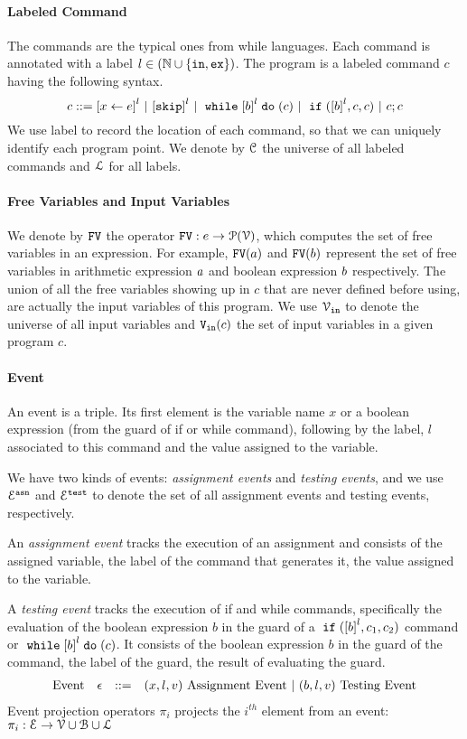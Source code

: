 \paragraph{Labeled Command}
The commands are the typical ones from while languages. Each command is annotated with a label $l \in (\mathbb{N} \cup \{\mathtt{in}, \mathtt{ex}\})$. The program is a labeled command $c$ having the following syntax. 
\[
{c} ::= 
\clabel{\assign{x}{\expr}}^l 
~|~  \clabel{\eskip}^l
~|~ \ewhile \clabel{\bexpr}^{l} \edo ({c})
~|~ \eif(\clabel{\bexpr}^{l} , {c}, {c}) 
~|~ {c};{c} 
\]
We use label to record
the location of each command, so that we can uniquely identify each program point.
We denote by $\mathcal{C}$ the universe of all labeled commands and $\mathcal{L}$ for all labels.

\paragraph{Free Variables and Input Variables}
  We denote by $\mathtt{FV}$ the operator $\mathtt{FV}: e \to \mathcal{P}(\mathcal{V})$, which computes the set of free variables in an expression. For example,
  $\mathtt{FV}(a)$ and $\mathtt{FV}(b)$ represent the set of free variables in arithmetic
  expression $a$ and boolean expression $b$ respectively.
  The union of all the free variables
  showing up in $c$ that are never defined before using, are actually the input variables of this program.
  We use $\mathcal{V}_{\mathtt{in}}$ to denote the universe of all input variables and $\mathtt{V_{\mathtt{in}}}(c)$ the set of input variables in a given program $c$.


\paragraph{Event}
An event is a triple.
Its first element is the variable name $x$
or a boolean expression (from the guard of if or while command), 
following by 
 the label, $l$ associated to this command and the value assigned to the variable.

 We have two kinds of events: \emph{assignment events} and \emph{testing events},
 and we use $\mathcal{E}^{\mathtt{{asn}}}$ and $\mathcal{E}^{\mathtt{{test}}}$ to denote the set of all assignment events and testing events, respectively.

 An \emph{assignment event} tracks the execution of an assignment and consists of the assigned variable, the label of the command that generates it, the value assigned to the variable.

 A \emph{testing event} tracks the execution of if and while commands, specifically the evaluation of the boolean expression $b$ in the guard of a $\eif(\clabel{b}^l, c_1, c_2)$ command or $\ewhile \clabel{b}^l \edo (c)$.
 It consists of the boolean expression $b$ in the guard of the command, the label of the guard, the result of evaluating the guard.
%
\[
\begin{array}{llll}
  \mbox{Event} 
  & \mathtt{\epsilon} & ::= & 
  ({x}, l, v) ~ \mbox{Assignment Event} 
  ~|~(b, l, v) ~ \mbox{Testing Event}
\end{array}
\]
Event projection operators $\pi_i$ projects the $i^{th}$ element from an event: 
$\pi_i : \mathcal{E} \to \mathcal{V} \cup \mathcal{B} \cup \mathcal{L} $

